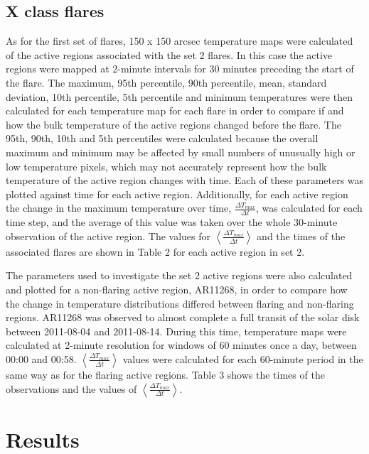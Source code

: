 \documentclass[namedreferences]{solarphysics}
\begin{document}
\subsection{X class flares}
As for the first set of flares, 150 x 150 arcsec temperature maps were calculated of the active regions associated with the set 2 flares.
In this case the active regions were mapped at 2-minute intervals for 30 minutes preceding the start of the flare.
The maximum, 95th percentile, 90th percentile, mean, standard deviation, 10th percentile, 5th percentile and minimum temperatures were then calculated for each temperature map for each flare in order to compare if and how the bulk temperature of the active regions changed before the flare.
The 95th, 90th, 10th and 5th percentiles were calculated because the overall maximum and minimum may be affected by small numbers of unusually high or low temperature pixels, which may not accurately represent how the bulk temperature of the active region changes with time.
Each of these parameters was plotted against time for each active region.
Additionally, for each active region the change in the maximum temperature over time, $\frac{\Delta T_{max}}{\Delta t}$, was calculated for each time step, and the average of this value was taken over the whole 30-minute observation of the active region.
The values for $\left\langle \frac{\Delta T_{max}}{\Delta t}\right\rangle$ and the times of the associated flares are shown in Table 2 for each active region in set 2. %

The parameters used to investigate the set 2 active regions were also calculated and plotted for a non-flaring active region, AR11268, in order to compare how the change in temperature distributions differed between flaring and non-flaring regions.
AR11268 was observed to almost complete a full transit of the solar disk between 2011-08-04 and 2011-08-14.
During this time, temperature maps were calculated at 2-minute resolution for windows of 60 minutes once a day, between 00:00 and 00:58. $\left\langle \frac{\Delta T_{max}}{\Delta t}\right\rangle$ values were calculated for each 60-minute period in the same way as for the flaring active regions.
Table 3 shows the times of the observations and the values of $\left\langle \frac{\Delta T_{max}}{\Delta t}\right\rangle$.


\section{Results}
\end{document}
